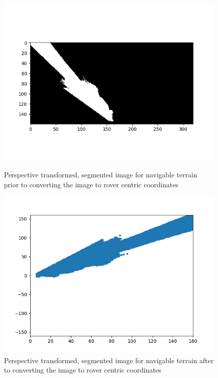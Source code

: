 \documentclass[a4paper]{article}
\begin{document}
\vspace{2cm}

\begin{figure}[h]
\centering
\begin{minipage}[t]{0.45\linewidth}
\centering
\includegraphics[scale=0.45]{image19}
\caption{Perspective transformed, segmented image for navigable terrain prior to converting the image to rover centric coordinates}
\end{minipage}
\hspace{0.5cm}
\begin{minipage}[t]{0.45\linewidth}
\centering
\includegraphics[scale=0.45]{image20}
\caption{Perspective transformed, segmented image for navigable terrain after to converting the image to rover centric coordinates}
\end{minipage}
\end{figure}
\end{document}
